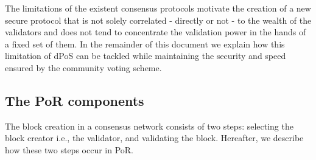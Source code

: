 \documentclass[]{article}
\begin{document}
The limitations of the existent consensus protocols motivate the creation of a new secure protocol that is not solely correlated - directly or not - to the wealth of the validators and does not tend to concentrate the validation power in the hands of a fixed set of them. In the remainder of this document we explain how this limitation of dPoS can be tackled while maintaining the security and speed ensured by the community voting scheme.


\subsection{The PoR components}
\label{sec:components}
The block creation in a consensus network consists of two steps: selecting the block creator i.e., the validator, and validating the block. Hereafter, we describe how these two steps occur in PoR.   
\end{document}
